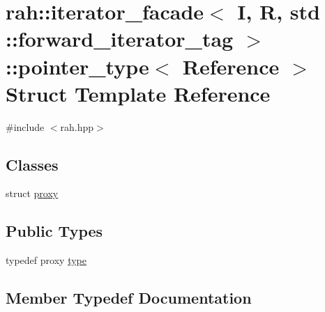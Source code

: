 \hypertarget{structrah_1_1iterator__facade_3_01_i_00_01_r_00_01std_01_1_1forward__iterator__tag_01_4_1_1pointer__type}{}\section{rah\+::iterator\+\_\+facade$<$ I, R, std \+::forward\+\_\+iterator\+\_\+tag $>$\+::pointer\+\_\+type$<$ Reference $>$ Struct Template Reference}
\label{structrah_1_1iterator__facade_3_01_i_00_01_r_00_01std_01_1_1forward__iterator__tag_01_4_1_1pointer__type}


{\ttfamily \#include $<$rah.\+hpp$>$}

\subsection*{Classes}
\begin{DoxyCompactItemize}
\item 
struct \mbox{\hyperlink{structrah_1_1iterator__facade_3_01_i_00_01_r_00_01std_01_1_1forward__iterator__tag_01_4_1_1pointer__type_1_1proxy}{proxy}}
\end{DoxyCompactItemize}
\subsection*{Public Types}
\begin{DoxyCompactItemize}
\item 
typedef proxy \mbox{\hyperlink{structrah_1_1iterator__facade_3_01_i_00_01_r_00_01std_01_1_1forward__iterator__tag_01_4_1_1pointer__type_a6dfc5e7e50df83f855dd5e3478f122a5}{type}}
\end{DoxyCompactItemize}


\subsection{Member Typedef Documentation}
\mbox{\label{structrah_1_1iterator__facade_3_01_i_00_01_r_00_01std_01_1_1forward__iterator__tag_01_4_1_1pointer__type_a6dfc5e7e50df83f855dd5e3478f122a5}} 
